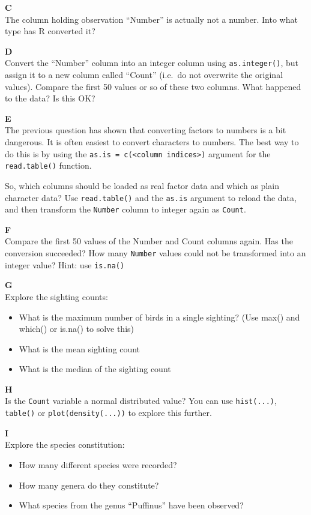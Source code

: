 \documentclass[]{book}
\providecommand{\tightlist}{%
  \setlength{\itemsep}{0pt}\setlength{\parskip}{0pt}}
\begin{document}
\textbf{C}\\
The column holding observation ``Number'' is actually not a number. Into what type has R converted it?

\textbf{D}\\
Convert the ``Number'' column into an integer column using \texttt{as.integer()}, but assign it to a new column called ``Count'' (i.e.~do not overwrite the original values). Compare the first 50 values or so of these two columns. What happened to the data? Is this OK?

\textbf{E}\\
The previous question has shown that converting factors to numbers is a bit dangerous. It is often easiest to convert characters to numbers. The best way to do this is by using the \texttt{as.is\ =\ c(\textless{}column\ indices\textgreater{})} argument for the \texttt{read.table()} function.

So, which columns should be loaded as real factor data and which as plain character data? Use \texttt{read.table()} and the \texttt{as.is} argument to reload the data, and then transform the \texttt{Number} column to integer again as \texttt{Count}.

\textbf{F}\\
Compare the first 50 values of the Number and Count columns again. Has the conversion succeeded? How many \texttt{Number} values could not be transformed into an integer value? Hint: use \texttt{is.na()}

\textbf{G}\\
Explore the sighting counts:

\begin{itemize}
\tightlist
\item
  What is the maximum number of birds in a single sighting? (Use max() and which() or is.na() to solve this)
\item
  What is the mean sighting count
\item
  What is the median of the sighting count
\end{itemize}

\textbf{H}\\
Is the \texttt{Count} variable a normal distributed value? You can use \texttt{hist(...)}, \texttt{table()} or \texttt{plot(density(...))} to explore this further.

\textbf{I}\\
Explore the species constitution:

\begin{itemize}
\tightlist
\item
  How many different species were recorded?
\item
  How many genera do they constitute?
\item
  What species from the genus ``Puffinus'' have been observed?
\end{itemize}
\end{document}
